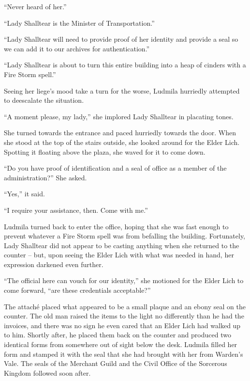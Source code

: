  

“Never heard of her.”

 

“Lady Shalltear is the Minister of Transportation.”

 

“Lady Shalltear will need to provide proof of her identity and provide a seal so we can add it to our archives for authentication.”

 

“Lady Shalltear is about to turn this entire building into a heap of cinders with a Fire Storm spell.”

 

Seeing her liege’s mood take a turn for the worse, Ludmila hurriedly attempted to deescalate the situation.

 

“A moment please, my lady,” she implored Lady Shalltear in placating tones.

 

She turned towards the entrance and paced hurriedly towards the door. When she stood at the top of the stairs outside, she looked around for the Elder Lich. Spotting it floating above the plaza, she waved for it to come down.

 

“Do you have proof of identification and a seal of office as a member of the administration?” She asked.

 

“Yes,” it said.

 

“I require your assistance, then. Come with me.”

 

Ludmila turned back to enter the office, hoping that she was fast enough to prevent whatever a Fire Storm spell was from befalling the building. Fortunately, Lady Shalltear did not appear to be casting anything when she returned to the counter – but, upon seeing the Elder Lich with what was needed in hand, her expression darkened even further.

 

“The official here can vouch for our identity,” she motioned for the Elder Lich to come forward, “are these credentials acceptable?”

 

The attaché placed what appeared to be a small plaque and an ebony seal on the counter. The old man raised the items to the light no differently than he had the invoices, and there was no sign he even cared that an Elder Lich had walked up to him. Shortly after, he placed them back on the counter and produced two identical forms from somewhere out of sight below the desk. Ludmila filled her form and stamped it with the seal that she had brought with her from Warden’s Vale. The seals of the Merchant Guild and the Civil Office of the Sorcerous Kingdom followed soon after.


